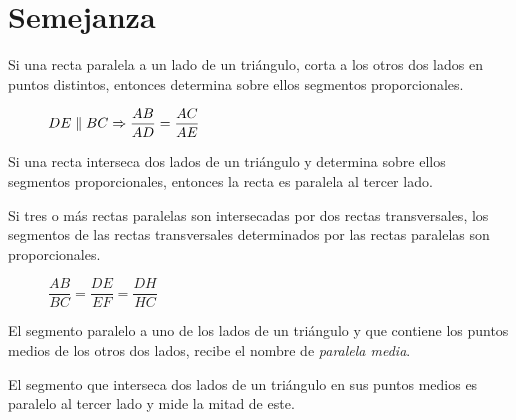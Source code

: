 \clearpage
\section{Semejanza}

\begin{theorem}
    Si una recta paralela a un lado de un triángulo, corta a los otros dos lados en puntos distintos, entonces determina sobre ellos segmentos proporcionales.
    
    \begin{figure}[!h]
        \centering
        
        \caption{$DE \parallel BC \Rightarrow \dfrac{AB}{AD} = \dfrac{AC}{AE}$}
        \label{fig:parlela-triangular}
    \end{figure}
\end{theorem}

\begin{theorem}
    Si una recta interseca dos lados de un triángulo y determina sobre ellos segmentos proporcionales, entonces la recta es paralela al tercer lado.    
\end{theorem}

\begin{theorem}
    Si tres o más rectas paralelas son intersecadas por dos rectas transversales, los segmentos de las rectas transversales determinados por las rectas paralelas son proporcionales.

    \begin{figure}[!h]
        \centering
        
        \caption{$\dfrac{AB}{BC} = \dfrac{DE}{EF} = \dfrac{DH}{HC}$}
        \label{fig:teorema-tales}
    \end{figure}    
\end{theorem}

\clearpage

\begin{definition}
    El segmento paralelo a uno de los lados de un triángulo y que contiene los puntos medios de los otros dos lados, recibe el nombre de \textit{paralela media}.
\end{definition}

\begin{theorem}
    El segmento que interseca dos lados de un triángulo en sus puntos medios es paralelo al tercer lado y mide la mitad de este.
\end{theorem}

